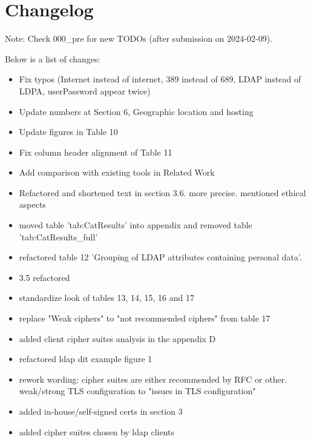 \onecolumn
\section*{Changelog}
Note: Check 000\_pre for new TODOs (after submission on 2024-02-09).

Below is a list of changes:
\begin{itemize}
    \item Fix typos (Internet instead of internet, 389 instead of 689, LDAP instead of LDPA, userPassword appear twice)
    \item Update numbers at Section 6, Geographic location and hosting
    \item Update figures in Table 10
    \item Fix column header alignment of Table 11
    \item Add comparison with existing tools in Related Work
    \item Refactored and shortened text in section 3.6. more precise. mentioned ethical aspects
    \item moved table 'tab:CatResults' into appendix and removed table 'tab:CatResults\_full'
    \item refactored table 12 'Grouping of LDAP attributes containing personal data'.
    \item 3.5 refactored 
    \item standardize look of tables 13, 14, 15, 16 and 17
    \item replace "Weak ciphers" to "not recommended ciphers" from table 17
    \item added client cipher suites analysis in the appendix D
    \item refactored ldap dit example figure 1
    \item rework wording: cipher suites are either recommended by RFC or other. weak/strong TLS configuration to "issues in TLS configuration"
    \item added in-house/self-signed certs in section 3
    \item added cipher suites chosen by ldap clients
\end{itemize}

\vfill
\pagebreak
\twocolumn